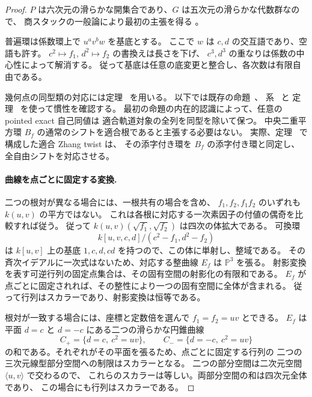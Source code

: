 \begin{proof}
$P$ は六次元の滑らかな開集合であり、$G$ は五次元の滑らかな代数群なので、
商スタックの一般論により最初の主張を得る
\cite[Tag 0DLS]{StacksModuli}。

普遍環は係数環上で $u^a v^b w$ を基底とする。
ここで $w$ は $c,d$ の交互語であり、空語も許す。
$c^2\mapsto f_1$, $d^2\mapsto f_2$ の書換えは長さを下げ、
$c^3,d^3$ の重なりは係数の中心性によって解消する。
従って基底は任意の底変更と整合し、各次数は有限自由である。

幾何点の同型類の対応には定理~\cite[\texttt{thm:noncubic-classification}]{QuadricIntrinsic2026} を用いる。
以下では既存の命題~\cite[\texttt{prop:first-orbit-object}]{QuadricIntrinsic2026}、
系~\cite[\texttt{cor:first-orbit-rank-invariance}]{QuadricIntrinsic2026} と
定理~\cite[\texttt{thm:ore-anticommuting-central}]{QuadricIntrinsic2026} を使って慣性を確認する。
最初の命題の内在的認識によって、任意の pointed exact 自己同値は
適合軌道対象の全列を同型を除いて保つ。
中央二重平方環 $B_f$ の通常のシフトを適合根であると主張する必要はない。
実際、定理~\cite[\texttt{thm:ore-anticommuting-central}]{QuadricIntrinsic2026} で構成した適合 Zhang twist は、
その添字付き環を $B_f$ の添字付き環と同定し、全自由シフトを対応させる。

\paragraph{曲線を点ごとに固定する変換.}
二つの根対が異なる場合には、一根共有の場合を含め、
$f_1,f_2,f_1f_2$ のいずれも $k(u,v)$ の平方ではない。
これは各根に対応する一次素因子の付値の偶奇を比較すれば従う。
従って $k(u,v)(\sqrt{f_1},\sqrt{f_2})$ は四次の体拡大である。
可換環
\[
 k[u,v,c,d]/(c^2-f_1,d^2-f_2)
\]
は $k[u,v]$ 上の基底 $1,c,d,cd$ を持つので、この体に単射し、整域である。
その斉次イデアルに一次式はないため、対応する整曲線 $E_f$ は $\mathbb P^3$ を張る。
射影変換を表す可逆行列の固定点集合は、その固有空間の射影化の有限和である。
$E_f$ が点ごとに固定されれば、その整性により一つの固有空間に全体が含まれる。
従って行列はスカラーであり、射影変換は恒等である。

根対が一致する場合には、座標と定数倍を選んで $f_1=f_2=uv$ とできる。
$E_f$ は平面 $d=c$ と $d=-c$ にある二つの滑らかな円錐曲線
\[
 C_+=\{d=c,\ c^2=uv\},\qquad
 C_-=\{d=-c,\ c^2=uv\}
\]
の和である。それぞれがその平面を張るため、点ごとに固定する行列の
二つの三次元線型部分空間への制限はスカラーとなる。
二つの部分空間は二次元空間 $\langle u,v\rangle$ で交わるので、
これらのスカラーは等しい。両部分空間の和は四次元全体であり、
この場合にも行列はスカラーである。


\end{proof}
